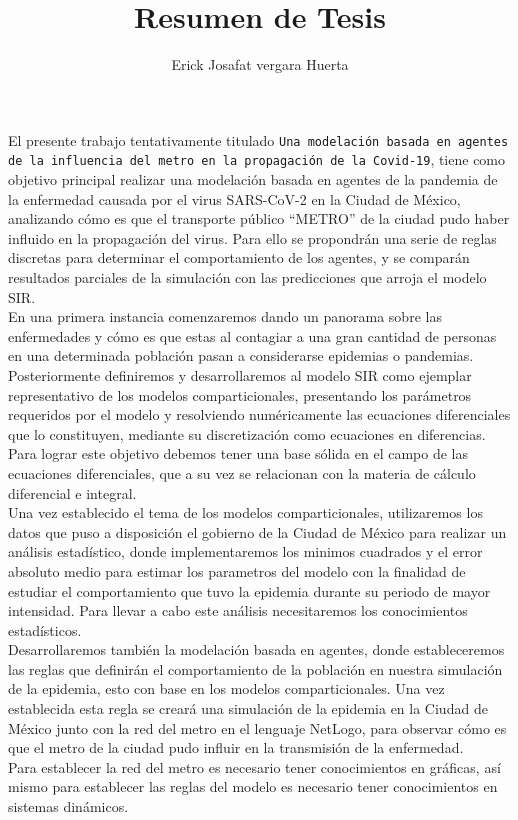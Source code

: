 \documentclass[a4paper,openany,12pt]{article}
\title{Resumen de Tesis}
\date{}
\author{Erick Josafat vergara Huerta}
\begin{document}
\maketitle


El presente trabajo tentativamente titulado \guillemotleft  \texttt{Una modelación basada en agentes de la influencia del metro en la propagación de la Covid-19}\guillemotright, tiene como objetivo principal realizar una modelación basada en agentes de la pandemia de la enfermedad causada por el virus SARS-CoV-2 en la Ciudad de México, analizando cómo es que el transporte público “METRO” de la ciudad pudo haber influido en la propagación del virus. Para ello se propondrán una serie de reglas discretas para determinar el comportamiento de los agentes, y se comparán resultados parciales de la simulación con las predicciones que arroja el modelo SIR.\\

En una primera instancia comenzaremos dando un panorama sobre las enfermedades y cómo es que estas al contagiar a una gran cantidad de personas en una determinada población pasan a considerarse epidemias o pandemias.\\

Posteriormente definiremos y desarrollaremos al modelo SIR como ejemplar representativo de los modelos comparticionales, presentando los parámetros requeridos por el modelo y resolviendo numéricamente las ecuaciones diferenciales que lo constituyen, mediante su discretización como ecuaciones en diferencias. Para lograr este objetivo debemos tener una base sólida en el campo de las ecuaciones diferenciales, que a su vez se relacionan con la materia de cálculo diferencial e integral. \\

Una vez establecido el tema de los modelos comparticionales, utilizaremos los datos que puso a disposición el gobierno de la Ciudad de México para realizar un análisis estadístico, donde implementaremos los minimos cuadrados y el error absoluto medio para estimar los parametros del modelo con la finalidad de estudiar el comportamiento que tuvo la epidemia durante su periodo de mayor intensidad. Para llevar a cabo este análisis necesitaremos los conocimientos estadísticos.\\

Desarrollaremos también la modelación basada en agentes, donde estableceremos las reglas que definirán el comportamiento de la población en nuestra simulación de la epidemia, esto con base en los modelos comparticionales. Una vez establecida esta regla se creará una simulación de la epidemia en la Ciudad de México junto con la red del metro en el lenguaje NetLogo, para observar cómo es que el metro de la ciudad pudo influir en la transmisión de la enfermedad.\\ Para establecer la red del metro es necesario tener conocimientos en gráficas, así mismo para establecer las reglas del modelo es necesario tener conocimientos en sistemas dinámicos. \\
\end{document}
